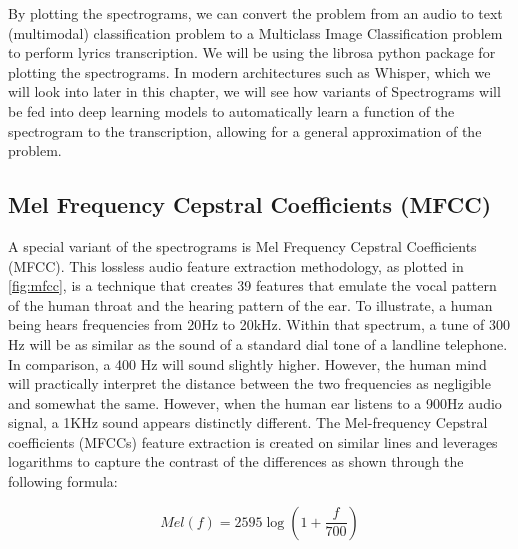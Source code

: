 By plotting the spectrograms, we can convert the problem from an audio to text (multimodal) classification problem to a Multiclass Image Classification problem to perform lyrics transcription. We will be using the librosa \cite{mcfee2015librosa} python package for plotting the spectrograms. In modern architectures such as Whisper, which we will look into later in this chapter, we will see how variants of Spectrograms will be fed into deep learning models to automatically learn a function of the spectrogram to the transcription, allowing for a general approximation of the problem.

\subsection{Mel Frequency Cepstral Coefficients (MFCC)}%
\label{sec:mfcc}

A special variant of the spectrograms is Mel Frequency Cepstral Coefficients (MFCC). This lossless audio feature extraction methodology, as plotted in \ref{fig:mfcc}, is a technique that creates 39 features that emulate the vocal pattern of the human throat and the hearing pattern of the ear. To illustrate, a human being hears frequencies from 20Hz to 20kHz. Within that spectrum, a tune of 300 Hz will be as similar as the sound of a standard dial tone of a landline telephone. In comparison, a 400 Hz will sound slightly higher. However, the human mind will practically interpret the distance between the two frequencies as negligible and somewhat the same. However, when the human ear listens to a 900Hz audio signal, a 1KHz sound appears distinctly different. The Mel-frequency Cepstral coefficients (MFCCs)  feature extraction is created on similar lines and leverages logarithms to capture the contrast of the differences as shown through the following formula:

\begin{equation}
{Mel}(f)=2595 \log \left(1+\frac{f}{700}\right)
\end{equation}

